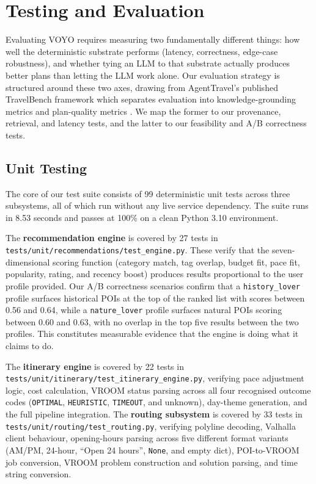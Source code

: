 \chapter{Testing and Evaluation}

Evaluating VOYO requires measuring two fundamentally different things: how well the
deterministic substrate performs (latency, correctness, edge-case robustness), and whether
tying an LLM to that substrate actually produces better plans than letting the LLM work alone.
Our evaluation strategy is structured around these two axes, drawing from AgentTravel's
published TravelBench framework which separates evaluation into knowledge-grounding metrics
and plan-quality metrics \cite{agenttravel_zhao_2024}. We map the former to our provenance,
retrieval, and latency tests, and the latter to our feasibility and A/B correctness tests.


\section{Unit Testing}

The core of our test suite consists of 99 deterministic unit tests across three subsystems, all
of which run without any live service dependency. The suite runs in 8.53 seconds and passes at
100\% on a clean Python 3.10 environment.

The \textbf{recommendation engine} is covered by 27 tests in
\texttt{tests/unit/recommendations/test\_engine.py}. These verify that the seven-dimensional
scoring function (category match, tag overlap, budget fit, pace fit, popularity, rating, and
recency boost) produces results proportional to the user profile provided. Our A/B correctness
scenarios confirm that a \texttt{history\_lover} profile surfaces historical POIs at the top of the
ranked list with scores between 0.56 and 0.64, while a \texttt{nature\_lover} profile surfaces
natural POIs scoring between 0.60 and 0.63, with no overlap in the top five results between the
two profiles. This constitutes measurable evidence that the engine is doing what it claims to do.

The \textbf{itinerary engine} is covered by 22 tests in
\texttt{tests/unit/itinerary/test\_itinerary\_engine.py}, verifying pace adjustment logic, cost
calculation, VROOM status parsing across all four recognised outcome codes
(\texttt{OPTIMAL}, \texttt{HEURISTIC}, \texttt{TIMEOUT}, and unknown), day-theme generation,
and the full pipeline integration. The \textbf{routing subsystem} is covered by 33 tests in
\texttt{tests/unit/routing/test\_routing.py}, verifying polyline decoding, Valhalla client
behaviour, opening-hours parsing across five different format variants (AM/PM, 24-hour,
``Open 24 hours'', \texttt{None}, and empty dict), POI-to-VROOM job conversion, VROOM problem
construction and solution parsing, and time string conversion.


